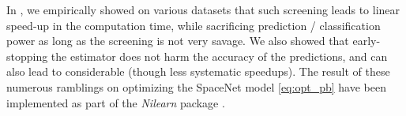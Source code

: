  In   \citep{dohmatob2015speeding}, we empirically showed on various
datasets that such screening leads to linear speed-up in the computation
time, while sacrificing prediction / classification power as long as the
screening is not very savage. We also showed that early-stopping the
estimator does not harm the accuracy of the predictions, and can also lead
to considerable (though less systematic speedups).
The result of these numerous ramblings on optimizing the SpaceNet model \eqref{eq:opt_pb} have been implemented as part of the \textit{Nilearn} package   \citep{nilearn}.







